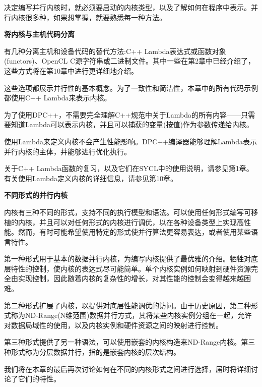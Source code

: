 决定编写并行内核时，就必须要启动的内核类型，以及了解如何在程序中表示。并行内核很多种，如果想掌握，就要熟悉每一种方法。\par

\hspace*{\fill} \par %
\textbf{将内核与主机代码分离}

有几种分离主机和设备代码的替代方法:C++ Lambda表达式或函数对象(functors)、OpenCL C源字符串或二进制文件。其中一些在第2章中已经介绍了，这些方式将在第10章中进行更详细地介绍。\par

这些选项都展示并行性的基本概念。为了一致性和简洁性，本章中的所有代码示例都使用C++ Lambda来表示内核。\par

\begin{tcolorbox}[colback=blue!5!white,colframe=blue!75!black, title=Lambda无害于性能]
为了使用DPC++，不需要完全理解C++规范中关于Lambda的所有内容——只需要知道Lambda可以表示内核，并且可以捕获的变量(按值)作为参数传递给内核。\par

使用Lambda来定义内核不会产生性能影响。DPC++编译器能够理解Lambda表示并行内核的主体，并能够进行优化执行。\par

关于C++ Lambda函数的复习，以及它们在SYCL中的使用说明，请参见第1章。有关使用Lambda定义内核的详细信息，请参见第10章。
\end{tcolorbox}

\hspace*{\fill} \par %
\textbf{不同形式的并行内核}

内核有三种不同的形式，支持不同的执行模型和语法。可以使用任何形式编写可移植的内核，并且可以对任何形式的内核进行调优，以在各种设备类型上实现高性能。然而，有时可能希望使用特定的形式使并行算法更容易表达，或者使用某些语言特性。\par

第一种形式用于基本的数据并行内核，为编写内核提供了最优雅的介绍。牺牲对底层特性的控制，使内核的表达式尽可能简单。单个内核实例如何映射到硬件资源完全由实现控制，因此随着内核的复杂性的增长，对其性能的控制会变得越来越困难。\par

第二种形式扩展了内核，以提供对底层性能调优的访问。由于历史原因，第二种形式称为ND-Range(N维范围)数据并行方式，其将某些内核实例分组在一起，允许对数据局域性的使用，以及内核实例和硬件资源之间的映射进行控制。\par

第三种形式提供了另一种语法，可以使用嵌套的内核构造来ND-Range内核。第三种形式称为分层数据并行，指的是嵌套内核的层次结构。\par

我们将在本章的最后再次讨论如何在不同的内核形式之间进行选择，届时将详细讨论了它们的特性。\par















